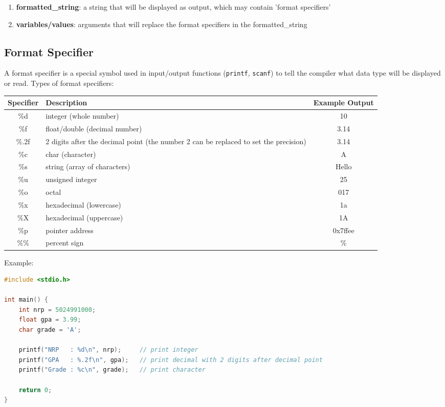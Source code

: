 \begin{enumerate}[label={}, leftmargin=*]
    \item \textbf{formatted\_string}: a string that will be displayed as output, which may contain 'format specifiers'
    \item \textbf{variables/values}: arguments that will replace the format specifiers in the formatted\_string
\end{enumerate}

\subsection{Format Specifier}

A format specifier is a special symbol used in input/output functions (\verb|printf|, \verb|scanf|) to tell the compiler what data type will be displayed or read.  
Types of format specifiers:
\begin{center}
    \begin{tabular}{|c|p{7cm}|c|}
        \hline
        \textbf{Specifier} & \textbf{Description} & \textbf{Example Output} \\ \hline
        \%d   & integer (whole number) & 10 \\ \hline
        \%f   & float/double (decimal number) & 3.14 \\ \hline
        \%.2f & 2 digits after the decimal point (the number 2 can be replaced to set the precision) & 3.14 \\ \hline
        \%c   & char (character) & A \\ \hline
        \%s   & string (array of characters) & Hello \\ \hline
        \%u   & unsigned integer & 25 \\ \hline
        \%o   & octal & 017 \\ \hline
        \%x   & hexadecimal (lowercase) & 1a \\ \hline
        \%X   & hexadecimal (uppercase) & 1A \\ \hline
        \%p   & pointer address & 0x7ffee \\ \hline
        \%\%  & percent sign & \% \\ \hline
    \end{tabular}
\end{center}
Example:
\begin{lstlisting}[language=c]
#include <stdio.h>

int main() {
    int nrp = 5024991000;
    float gpa = 3.99;
    char grade = 'A';

    printf("NRP   : %d\n", nrp);     // print integer
    printf("GPA   : %.2f\n", gpa);   // print decimal with 2 digits after decimal point
    printf("Grade : %c\n", grade);   // print character

    return 0;
}
\end{lstlisting}

